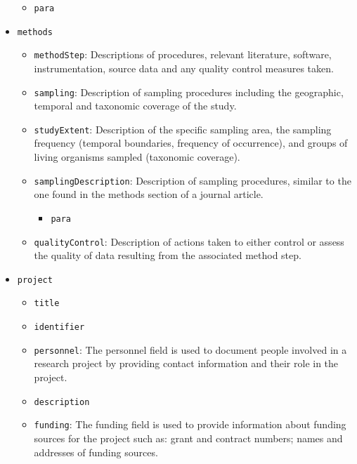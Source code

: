 \documentclass[
  letterpaper,
  DIV=11,
  numbers=noendperiod,
  oneside]{scrreprt}
\providecommand{\tightlist}{%
  \setlength{\itemsep}{0pt}\setlength{\parskip}{0pt}}\usepackage{longtable,booktabs,array}
\begin{document}
\begin{itemize}
  \begin{itemize}
  \tightlist
  \item
    \texttt{para}
  \end{itemize}
\item
  \texttt{methods}

  \begin{itemize}
  \tightlist
  \item
    \texttt{methodStep}: Descriptions of procedures, relevant
    literature, software, instrumentation, source data and any quality
    control measures taken.
  \item
    \texttt{sampling}: Description of sampling procedures including the
    geographic, temporal and taxonomic coverage of the study.
  \item
    \texttt{studyExtent}: Description of the specific sampling area, the
    sampling frequency (temporal boundaries, frequency of occurrence),
    and groups of living organisms sampled (taxonomic coverage).
  \item
    \texttt{samplingDescription}: Description of sampling procedures,
    similar to the one found in the methods section of a journal
    article.

    \begin{itemize}
    \tightlist
    \item
      \texttt{para}
    \end{itemize}
  \item
    \texttt{qualityControl}: Description of actions taken to either
    control or assess the quality of data resulting from the associated
    method step.
  \end{itemize}
\item
  \texttt{project}

  \begin{itemize}
  \tightlist
  \item
    \texttt{title}
  \item
    \texttt{identifier}
  \item
    \texttt{personnel}: The personnel field is used to document people
    involved in a research project by providing contact information and
    their role in the project.
  \item
    \texttt{description}
  \item
    \texttt{funding}: The funding field is used to provide information
    about funding sources for the project such as: grant and contract
    numbers; names and addresses of funding sources.


\end{itemize}
\end{itemize}
\end{document}
